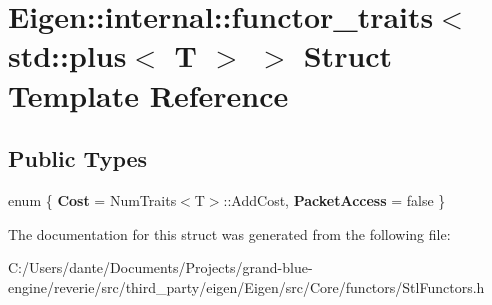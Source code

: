 \hypertarget{struct_eigen_1_1internal_1_1functor__traits_3_01std_1_1plus_3_01_t_01_4_01_4}{}\section{Eigen\+::internal\+::functor\+\_\+traits$<$ std\+::plus$<$ T $>$ $>$ Struct Template Reference}
\label{struct_eigen_1_1internal_1_1functor__traits_3_01std_1_1plus_3_01_t_01_4_01_4}
\subsection*{Public Types}
\begin{DoxyCompactItemize}
\item 
\mbox{\label{struct_eigen_1_1internal_1_1functor__traits_3_01std_1_1plus_3_01_t_01_4_01_4_a65422ca6fc02b2c8bf675cc1b33acfdd}} 
enum \{ {\bfseries Cost} = Num\+Traits$<$T$>$\+::Add\+Cost, 
{\bfseries Packet\+Access} = false
 \}
\end{DoxyCompactItemize}


The documentation for this struct was generated from the following file\+:\begin{DoxyCompactItemize}
\item 
C\+:/\+Users/dante/\+Documents/\+Projects/grand-\/blue-\/engine/reverie/src/third\+\_\+party/eigen/\+Eigen/src/\+Core/functors/Stl\+Functors.\+h\end{DoxyCompactItemize}
